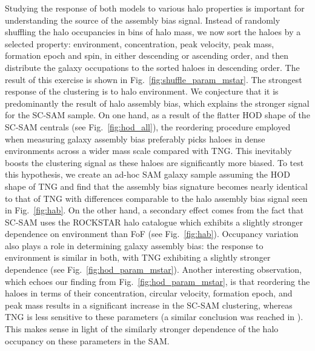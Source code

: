 \documentclass[fleqn,usenatbib]{mnras}
\newcommand{\rss}[1]{\textcolor{purple}{(rss: #1)}}
\begin{document}
Studying the response of both models to various halo properties is important for understanding the source of the assembly bias signal. Instead of randomly shuffling the halo occupancies in bins of halo mass, we now sort the haloes by a selected property: environment, concentration, peak velocity, peak mass, formation epoch and spin, in either descending or ascending order, and then distribute the galaxy occupations to the sorted haloes in descending order. The result of this exercise is shown in Fig.~\ref{fig:shuffle_param_mstar}. The strongest response of the clustering is to halo environment. We conjecture that it is predominantly the result of halo assembly bias, which explains the stronger signal for the SC-SAM sample. On one hand, as a result of the flatter HOD shape of the SC-SAM centrals (see Fig.~\ref{fig:hod_all}), the reordering procedure employed when measuring galaxy assembly bias preferably picks haloes in dense environments across a wider mass scale compared with TNG. This inevitably boosts the clustering signal as these haloes are significantly more biased. To test this hypothesis, we create an ad-hoc SAM galaxy sample assuming the HOD shape of TNG and find that the assembly bias signature becomes nearly identical to that of TNG with differences comparable to the halo assembly bias signal seen in Fig.~\ref{fig:hab}. On the other hand, a secondary effect comes from the fact that SC-SAM uses the \textsc{ROCKSTAR} halo catalogue which exhibits a slightly stronger dependence on environment than FoF (see Fig.~\ref{fig:hab}). 
Occupancy variation also plays a role in determining galaxy assembly bias: the response to environment is similar in both, with TNG exhibiting a slightly stronger dependence (see Fig.~\ref{fig:hod_param_mstar}). 
Another interesting observation, which echoes our finding from Fig.~\ref{fig:hod_param_mstar}, is that reordering the haloes in terms of their concentration, circular velocity, formation epoch, and peak mass results in a significant increase in the SC-SAM clustering, whereas TNG is less sensitive to these parameters (a similar conclusion was reached in \citet{2020MNRAS.493.5506H}). This makes sense in light of the similarly stronger dependence of the halo occupancy on these parameters in the SAM.
\end{document}
